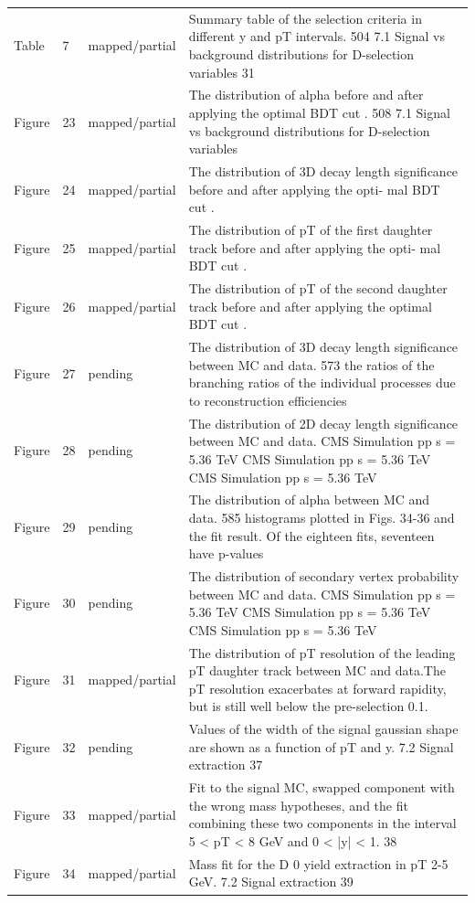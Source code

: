 \documentclass[11pt]{article}
\begin{document}
\begin{longtable}{lll p{}}
Table & 7 & mapped/partial & Summary table of the selection criteria in different y and pT intervals. 504 7.1 Signal vs background distributions for D-selection variables 31 \\
Figure & 23 & mapped/partial & The distribution of alpha before and after applying the optimal BDT cut . 508 7.1 Signal vs background distributions for D-selection variables \\
Figure & 24 & mapped/partial & The distribution of 3D decay length significance before and after applying the opti- mal BDT cut . \\
Figure & 25 & mapped/partial & The distribution of pT of the first daughter track before and after applying the opti- mal BDT cut . \\
Figure & 26 & mapped/partial & The distribution of pT of the second daughter track before and after applying the optimal BDT cut . \\
Figure & 27 & pending & The distribution of 3D decay length significance between MC and data. 573 the ratios of the branching ratios of the individual processes due to reconstruction efficiencies \\
Figure & 28 & pending & The distribution of 2D decay length significance between MC and data. CMS Simulation pp s = 5.36 TeV CMS Simulation pp s = 5.36 TeV CMS Simulation pp s = 5.36 TeV \\
Figure & 29 & pending & The distribution of alpha between MC and data. 585 histograms plotted in Figs. 34-36 and the fit result. Of the eighteen fits, seventeen have p-values \\
Figure & 30 & pending & The distribution of secondary vertex probability between MC and data. CMS Simulation pp s = 5.36 TeV CMS Simulation pp s = 5.36 TeV CMS Simulation pp s = 5.36 TeV \\
Figure & 31 & mapped/partial & The distribution of pT resolution of the leading pT daughter track between MC and data.The pT resolution exacerbates at forward rapidity, but is still well below the pre-selection 0.1. \\
Figure & 32 & pending & Values of the width of the signal gaussian shape are shown as a function of pT and y. 7.2 Signal extraction 37 \\
Figure & 33 & mapped/partial & Fit to the signal MC, swapped component with the wrong mass hypotheses, and the fit combining these two components in the interval 5 < pT < 8 GeV and 0 < |y| < 1. 38 \\
Figure & 34 & mapped/partial & Mass fit for the D 0 yield extraction in pT 2-5 GeV. 7.2 Signal extraction 39 \\

\end{longtable}
\end{document}
